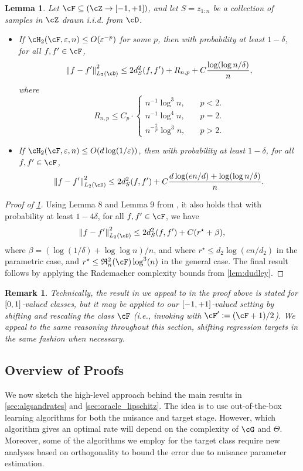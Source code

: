 \documentclass[11pt]{article} %
\newcommand{\pref}[1]{\cref{#1}}
\newcommand{\pfref}[1]{Proof of \pref{#1}}
\theoremstyle{theorem}  %
\newtheorem{lemma}{Lemma}
\theoremstyle{plain}
\newtheorem{remark}{Remark}
\DeclarePairedDelimiter{\brk}{[}{]}
\DeclarePairedDelimiter{\nrm}{\|}{\|}
\newcommand{\veps}{\varepsilon}
\newcommand{\ldef}{\vcentcolon=}
\newcommand{\zr}[1][n]{z_{1:#1}}
\newcommand{\bigoh}{O}
\newcommand{\unitrange}{\brk*{-1,+1}}
\newcommand{\Rad}{\mathfrak{R}_{n}}
\newcommand{\dtwo}{d_2}
\newcommand{\nuisance}{\cG}
\newcommand{\target}{\Theta}
\begin{document}
\begin{lemma}
\label{lem:l2_concentration}
Let $\cF\subseteq(\cZ\to\unitrange)$, and let $S=\zr[n]$ be a collection of samples in $\cZ$ drawn i.i.d. from $\cD$.
\begin{itemize}
\item If $\cH_2(\cF,\veps,n)\leq\bigoh(\veps^{-p})$ for some $p$, then with probability at least $1-\delta$, for all $f,f'\in\cF$,
\[
\nrm*{f-f'}_{L_2(\cD)}^{2}
\leq{} 2d_{S}^{2}(f,f') + R_{n,p} + C\frac{\log(\log{}n/\delta)}{n}, 
\]
where
\[
R_{n,p} \leq{} C_{p}\cdot\left\{\begin{array}{ll}
n^{-1}\log^{3}n,\quad&p<2.\\
n^{-1}\log^{4}n,\quad&p=2.\\
n^{-\frac{2}{p}}\log^{3}n,\quad&p>2.
\end{array}\right.
\]
\item
If $\cH_2(\cF,\veps,n)\leq{}\bigoh(d\log(1/\veps))$, then with probability at least $1-\delta$, for all $f,f'\in\cF$,
\[
\nrm*{f-f'}_{L_2(\cD)}^{2}
\leq{} 2d_{S}^{2}(f,f') + C\frac{d\log(en/d) + \log(\log{}n/\delta)}{n}.
\]
\end{itemize}
\end{lemma}
\begin{proof}[\pfref{lem:l2_concentration}]
Using Lemma 8 and Lemma 9 from \cite{rakhlin2017empirical}, it also holds that with probability at least $1-4\delta$, for all $f,f'\in\cF$, we have
\[
\nrm*{f-f'}_{L_2(\cD)}^{2}
\leq{} 2d_{S}^{2}(f,f') + C(r^{\star} + \beta), 
\]
where $\beta=(\log(1/\delta)+\log\log{}n)/n$, and where $r^{\star}\leq{}\dtwo\log(en/\dtwo)$ in the parametric case, and $r^{\star}\leq{}\Rad^{2}(\cF)\log^{3}(n)$ in the general case.  The final result follows by applying the Rademacher complexity bounds from \pref{lem:dudley}.


\end{proof}
\begin{remark}
\label{rem:shifted}
Technically, the result in \cite{rakhlin2017empirical} we appeal to in the proof above is stated for $\brk*{0,1}$-valued classes, but it may be applied to our $\brk*{-1,+1}$-valued setting by shifting and rescaling the class $\cF$ (i.e., invoking with $\cF'\ldef(\cF+1)/2$). We appeal to the same reasoning throughout this section, shifting regression targets in the same fashion when necessary.
\end{remark}

\subsection{Overview of Proofs}
We now sketch the high-level approach behind the main results in \pref{sec:algsandrates} and \pref{sec:oracle_lipschitz}. The idea is to use out-of-the-box learning algorithms for both the nuisance and target stage. However, which algorithm gives an optimal rate will depend on the complexity of $\nuisance$ and $\target$. Moreover, some of the algorithms we employ for the target class require new analyses based on orthogonality to bound the error due to nuisance parameter estimation.
\end{document}
